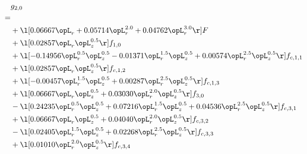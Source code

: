 \begin{alignat}{2} 
\label{eq:g_20_0} 
& g_{2,0} \nonumber \\ 
 = \\ 
& + \l[  0.06667 \opL_r +  0.05714 \opL_r^{2.0} +  0.04762 \opL_r^{3.0}  \r] F \nonumber \\ 
& + \l[  0.02857 \opL_r \opL_z^{0.5}  \r] f_{1,0} \nonumber \\ 
& + \l[  -0.14956 \opL_r^{0.5} \opL_z^{0.5}   -0.01371 \opL_r^{1.5} \opL_z^{0.5} +  0.00574 \opL_r^{2.5} \opL_z^{0.5}  \r] f_{c,1,1} \nonumber \\ 
& + \l[  0.02857 \opL_r \opL_z^{0.5}  \r] f_{c,1,2} \nonumber \\ 
& + \l[  -0.00457 \opL_r^{1.5} \opL_z^{0.5} +  0.00287 \opL_r^{2.5} \opL_z^{0.5}  \r] f_{c,1,3} \nonumber \\ 
& + \l[  0.06667 \opL_r \opL_z^{0.5} +  0.03030 \opL_r^{2.0} \opL_z^{0.5}  \r] f_{3,0} \nonumber \\ 
& - \l[  0.24235 \opL_r^{0.5} \opL_z^{0.5} +  0.07216 \opL_r^{1.5} \opL_z^{0.5} +  0.04536 \opL_r^{2.5} \opL_z^{0.5}  \r] f_{c,3,1} \nonumber \\ 
& + \l[  0.06667 \opL_r \opL_z^{0.5} +  0.04040 \opL_r^{2.0} \opL_z^{0.5}  \r] f_{c,3,2} \nonumber \\ 
& - \l[  0.02405 \opL_r^{1.5} \opL_z^{0.5} +  0.02268 \opL_r^{2.5} \opL_z^{0.5}  \r] f_{c,3,3} \nonumber \\ 
& + \l[  0.01010 \opL_r^{2.0} \opL_z^{0.5}  \r] f_{c,3,4} \nonumber \\ 
\end{alignat} 


